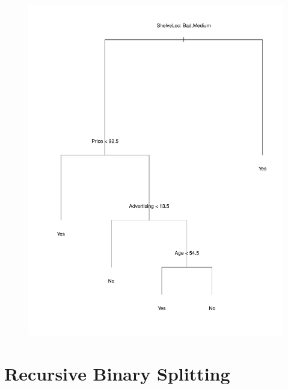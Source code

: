 \documentclass{beamer}
\theoremstyle{definition}
\begin{document}
\begin{frame}
\begin{figure}[h!]
\includegraphics[scale=0.28]{grafo1}
\end{figure}
\end{frame}

\section{Recursive Binary Splitting}
\begin{frame}
\begin{figure}[h!]

\end{figure}
\end{frame}

\begin{frame}
\begin{figure}[h!]

\end{figure}
\end{frame}
\end{document}
